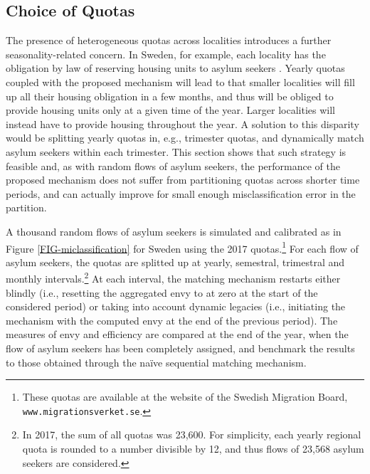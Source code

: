 \documentclass[12pt,fleqn]{article}
\begin{document}
\subsection{Choice of Quotas}\label{SEC:quotas}
The presence of heterogeneous quotas across localities introduces a further seasonality-related concern. In Sweden, for example, each locality has the obligation by law of reserving housing units to asylum seekers \citep[Swedish Law,][]{SFS2016}. Yearly quotas coupled with the proposed mechanism will lead to that smaller localities will fill up all their housing obligation in a few months, and thus will be obliged to provide housing units only at a given time of the year. Larger localities will instead have to provide housing throughout the year. A solution to this disparity would be splitting yearly quotas in, e.g., trimester quotas, and dynamically match asylum seekers within each trimester. This section shows that such strategy is feasible and, as with random flows of asylum seekers, the performance of the proposed mechanism does not suffer from partitioning quotas across shorter time periods, and can actually improve for small enough misclassification error in the partition.

A thousand random flows of asylum seekers is simulated and calibrated as in Figure \ref{FIG-miclassification} for Sweden using the 2017 quotas.\footnote{These quotas are available at the website of the Swedish Migration Board, \texttt{www.migrationsverket.se}.} For each flow of asylum seekers, the quotas are splitted up at yearly, semestral, trimestral and monthly intervals.\footnote{In 2017, the sum of all quotas was 23,600. For simplicity, each yearly regional quota is rounded to a number divisible by 12, and thus flows of 23,568 asylum seekers are considered.} At each interval, the matching mechanism restarts either blindly (i.e., resetting the aggregated envy to at zero at the start of the considered period) or taking into account dynamic legacies (i.e., initiating the mechanism with the computed envy at the end of the previous period). The measures of envy and efficiency are compared at the end of the year, when the flow of asylum seekers has been completely assigned, and benchmark the results to those obtained through the na\"{i}ve sequential matching mechanism.
\end{document}
